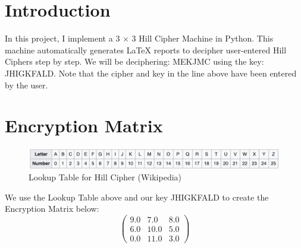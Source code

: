\documentclass{article}%
\begin{document}
%
\normalsize%
\section{Introduction}%
\label{sec:Introduction}%
In this project, I implement a 3  ×  3 Hill Cipher Machine in Python. This machine automatically generates LaTeX reports to decipher user{-}entered Hill Ciphers step by step. \newline%
 \newline%
%
We will be deciphering: MEKJMC using the key: JHIGKFALD. \newline%
 \newline%
%
Note that the cipher and key in the line above have been entered by the user.

%
\section{Encryption Matrix}%
\label{sec:EncryptionMatrix}%


\begin{figure}[h!]%
\centering%
\includegraphics[width=420px]{./LookupHill.png}%
\caption{Lookup Table for Hill Cipher (Wikipedia)}%
\end{figure}

%
We use the Lookup Table above and our key JHIGKFALD to create the Encryption Matrix below: \newline%
%
\[%
\begin{pmatrix}%
9.0&7.0&8.0\\%
6.0&10.0&5.0\\%
0.0&11.0&3.0%
\end{pmatrix}%
\]

%
\end{document}
